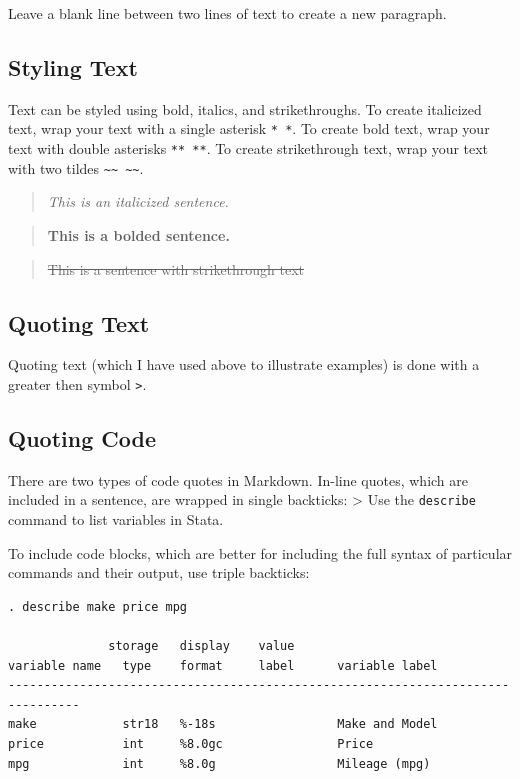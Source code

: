 \documentclass[]{book}
\begin{document}
Leave a blank line between two lines of text to create a new paragraph.

\subsection{Styling Text}\label{styling-text}

Text can be styled using bold, italics, and strikethroughs. To create
italicized text, wrap your text with a single asterisk \texttt{*\ *}. To
create bold text, wrap your text with double asterisks \texttt{**\ **}.
To create strikethrough text, wrap your text with two tildes
\texttt{\textasciitilde{}\textasciitilde{}\ \textasciitilde{}\textasciitilde{}}.

\begin{quote}
\emph{This is an italicized sentence.}
\end{quote}

\begin{quote}
\textbf{This is a bolded sentence.}
\end{quote}

\begin{quote}
\sout{This is a sentence with strikethrough text}
\end{quote}

\subsection{Quoting Text}\label{quoting-text}

Quoting text (which I have used above to illustrate examples) is done
with a greater then symbol \texttt{\textgreater{}}.

\subsection{Quoting Code}\label{quoting-code}

There are two types of code quotes in Markdown. In-line quotes, which
are included in a sentence, are wrapped in single backticks:
\textgreater{} Use the \texttt{describe} command to list variables in
Stata.

To include code blocks, which are better for including the full syntax
of particular commands and their output, use triple backticks:

\begin{verbatim}
. describe make price mpg

              storage   display    value
variable name   type    format     label      variable label
--------------------------------------------------------------------------------
make            str18   %-18s                 Make and Model
price           int     %8.0gc                Price
mpg             int     %8.0g                 Mileage (mpg)
\end{verbatim}
\end{document}
